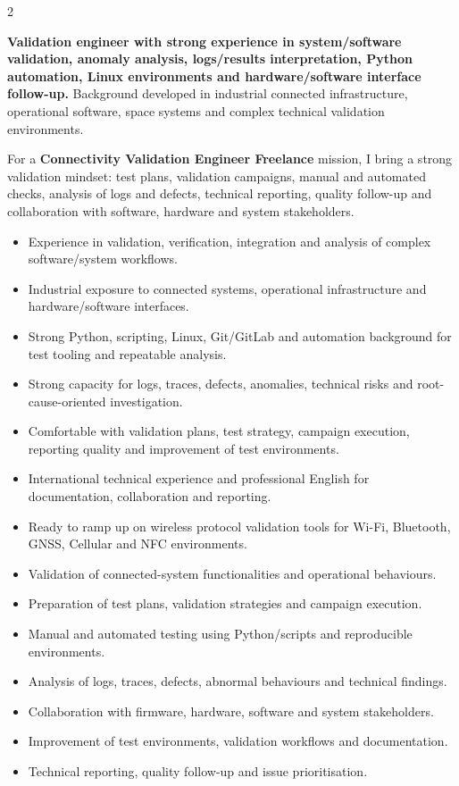 \documentclass[8pt,a4paper,ragged2e,withhyper]{altacv}
\begin{document}
\begin{paracol}{2}
\switchcolumn


\textbf{Validation engineer with strong experience in system/software validation, anomaly analysis, logs/results interpretation, Python automation, Linux environments and hardware/software interface follow-up.} Background developed in industrial connected infrastructure, operational software, space systems and complex technical validation environments.

For a \textbf{Connectivity Validation Engineer Freelance} mission, I bring a strong validation mindset: test plans, validation campaigns, manual and automated checks, analysis of logs and defects, technical reporting, quality follow-up and collaboration with software, hardware and system stakeholders.

\begin{itemize}
  \item Experience in validation, verification, integration and analysis of complex software/system workflows.
  \item Industrial exposure to connected systems, operational infrastructure and hardware/software interfaces.
  \item Strong Python, scripting, Linux, Git/GitLab and automation background for test tooling and repeatable analysis.
  \item Strong capacity for logs, traces, defects, anomalies, technical risks and root-cause-oriented investigation.
  \item Comfortable with validation plans, test strategy, campaign execution, reporting quality and improvement of test environments.
  \item International technical experience and professional English for documentation, collaboration and reporting.
  \item Ready to ramp up on wireless protocol validation tools for Wi-Fi, Bluetooth, GNSS, Cellular and NFC environments.
\end{itemize}


\begin{itemize}
  \item Validation of connected-system functionalities and operational behaviours.
  \item Preparation of test plans, validation strategies and campaign execution.
  \item Manual and automated testing using Python/scripts and reproducible environments.
  \item Analysis of logs, traces, defects, abnormal behaviours and technical findings.
  \item Collaboration with firmware, hardware, software and system stakeholders.
  \item Improvement of test environments, validation workflows and documentation.
  \item Technical reporting, quality follow-up and issue prioritisation.
\end{itemize}


\end{paracol}
\end{document}
